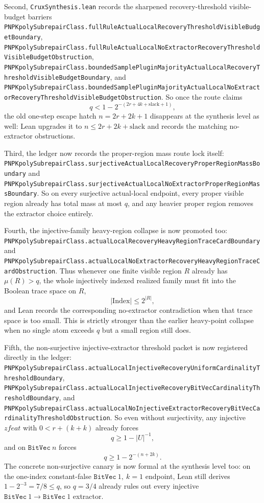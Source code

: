 \documentclass[11pt]{article}
\theoremstyle{remark}
\begin{document}
Second, \texttt{CruxSynthesis.lean} records the sharpened recovery-threshold
visible-budget barriers
\texttt{PNPKpolySubrepairClass.fullRuleActualLocalRecoveryThresholdVisibleBudgetBoundary},
\texttt{PNPKpolySubrepairClass.fullRuleActualLocalNoExtractorRecoveryThresholdVisibleBudgetObstruction},
\texttt{PNPKpolySubrepairClass.boundedSamplePluginMajorityActualLocalRecoveryThresholdVisibleBudgetBoundary},
and
\texttt{PNPKpolySubrepairClass.boundedSamplePluginMajorityActualLocalNoExtractorRecoveryThresholdVisibleBudgetObstruction}.
So once the route claims
\[
  q < 1 - 2^{-(2r+4k+\mathrm{slack}+1)},
\]
the old one-step escape hatch \(n=2r+2k+1\) disappears at the synthesis level
as well: Lean upgrades it to \(n \le 2r+2k+\mathrm{slack}\) and records the
matching no-extractor obstructions.

Third, the ledger now records the proper-region mass route lock itself:
\texttt{PNPKpolySubrepairClass.surjectiveActualLocalRecoveryProperRegionMassBoundary}
and
\texttt{PNPKpolySubrepairClass.surjectiveActualLocalNoExtractorProperRegionMassBoundary}.
So on every surjective actual-local endpoint, every proper visible region
already has total mass at most \(q\), and any heavier proper region removes the
extractor choice entirely.

Fourth, the injective-family heavy-region collapse is now promoted too:
\texttt{PNPKpolySubrepairClass.actualLocalRecoveryHeavyRegionTraceCardBoundary}
and
\texttt{PNPKpolySubrepairClass.actualLocalNoExtractorRecoveryHeavyRegionTraceCardObstruction}.
Thus whenever one finite visible region \(R\) already has \(\mu(R)>q\), the
whole injectively indexed realized family must fit into the Boolean trace space
on \(R\),
\[
  |\mathrm{Index}| \le 2^{|R|},
\]
and Lean records the corresponding no-extractor contradiction when that trace
space is too small.  This is strictly stronger than the earlier heavy-point
collapse when no single atom exceeds \(q\) but a small region still does.

Fifth, the non-surjective injective-extractor threshold packet is now
registered directly in the ledger:
\texttt{PNPKpolySubrepairClass.actualLocalInjectiveRecoveryUniformCardinalityThresholdBoundary},
\texttt{PNPKpolySubrepairClass.actualLocalInjectiveRecoveryBitVecCardinalityThresholdBoundary},
and
\texttt{PNPKpolySubrepairClass.actualLocalNoInjectiveExtractorRecoveryBitVecCardinalityThresholdObstruction}.
So even without surjectivity, any injective \(zfeat\) with
\(0<r+(k+k)\) already forces
\[
  q \ge 1-|U|^{-1},
\]
and on \(\texttt{BitVec}\ n\) forces
\[
  q \ge 1 - 2^{-(n+2k)}.
\]
The concrete non-surjective canary is now formal at the synthesis level too:
on the one-index constant-false
\(\texttt{BitVec}\ 1,\ k=1\) endpoint, Lean still derives
\(1-2^{-3}=7/8 \le q\), so \(q=3/4\) already rules out every injective
\(\texttt{BitVec}\ 1 \to \texttt{BitVec}\ 1\) extractor.
\end{document}
